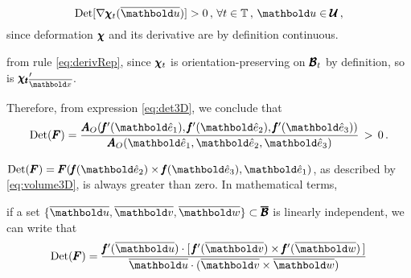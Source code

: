 \begin{equation}
\textnormal{Det}[\fua{\nabla\tnr{\chi}_t}{\overline{\vto{u}}}]>0\,,\,\forall t\in\cam{T}\,,\,\vto{u}\in\tnr{\mathcal{U}}\,,
\end{equation}
since deformation $\pmb{\chi}$ and its derivative are by definition continuous. 


from rule \eqref{eq:derivRep}, since $\pmb{\chi}_t$ is orientation-preserving on $\pmb{\mathcal{B}}_t$ by definition, so is $\tnr{\chi_t}'_{\overline{\vto{x}}}$. 



Therefore, from expression \eqref{eq:det3D}, we conclude that
\begin{equation}
\hdet{\tnr{F}}=\dfrac{\fua{\tnr{A}_O}{\fua{\tnr{\mathit{f}}'}{\vun{e}_1},{\fua{\tnr{\mathit{f}}'}{\vun{e}_2}},{\fua{\tnr{\mathit{f}}'}{\vun{e}_3}}}}{\fua{\tnr{A}_O}{\vun{e}_1,\vun{e}_2,\vun{e}_3}}\,>\,0\,.
\end{equation}


$\hdet{\tnr{F}}=\fua{\tnr{F}}{\fua{\tnr{\mathit{f}}}{\vun{e}_2}\times\fua{\tnr{\mathit{f}}}{\vun{e}_3},\vun{e}_1}$, as described by \eqref{eq:volume3D}, is always greater than zero. In mathematical terms,




if a set $\{\overline{\vto{u}},\overline{\vto{v}},\overline{\vto{w}}\}\subset \tnr{\overline{\mathcal{B}}}$ is linearly independent, we can write that 
\begin{equation}
\hdet{\tnr{F}}=\dfrac{\fua{\tnr{\mathit{f}}'}{\overline{\vto{u}}}\cdot[\,\fua{\tnr{\mathit{f}}'}{\overline{\vto{v}}}\times\fua{\tnr{\mathit{f}}'}{\overline{\vto{w}}}\,]}{\overline{\vto{u}}\cdot(\overline{\vto{v}}\times\overline{\vto{w}})}
\end{equation}







 

